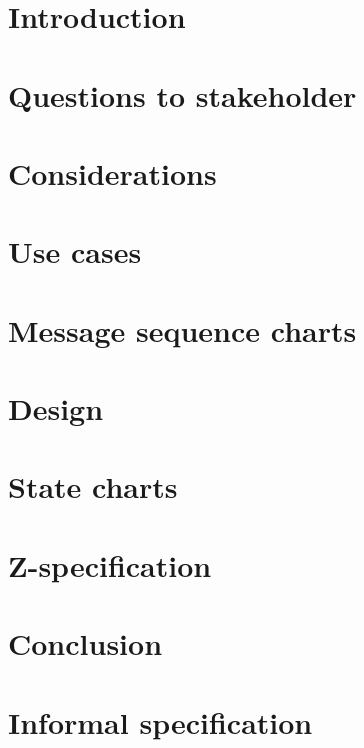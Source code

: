 \documentclass[a4paper,11pt]{article}
\begin{document}
	
	
	\tableofcontents
	\newpage
	
	\section{Introduction}
	
	\newpage

	\section{Questions to stakeholder}
	
	\newpage

	\section{Considerations}
	
	\newpage
	
	\section{Use cases}
	
	\newpage

	\section{Message sequence charts}
	
	\newpage

	\section{Design}
	
	\newpage

	\section{State charts}
	
	\newpage

	\section{Z-specification}
	
	\newpage

	\section{Conclusion}
	
	\newpage

	\appendix
	\section{Informal specification}
		\label{appendix:informal}
		
\end{document}
